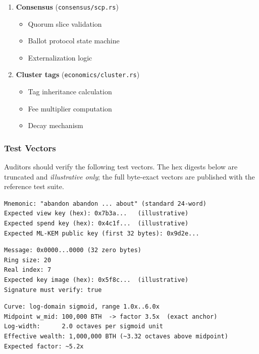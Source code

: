 \begin{enumerate}
  \item \textbf{Consensus} (\texttt{consensus/scp.rs})
    \begin{itemize}
      \item Quorum slice validation
      \item Ballot protocol state machine
      \item Externalization logic
    \end{itemize}

  \item \textbf{Cluster tags} (\texttt{economics/cluster.rs})
    \begin{itemize}
      \item Tag inheritance calculation
      \item Fee multiplier computation
      \item Decay mechanism
    \end{itemize}
\end{enumerate}

\subsubsection{Test Vectors}

Auditors should verify the following test vectors. The hex digests below are
truncated and \emph{illustrative only}; the full byte-exact vectors are
published with the reference test suite.

\begin{lstlisting}[caption={Key derivation test vector (illustrative)}]
Mnemonic: "abandon abandon ... about" (standard 24-word)
Expected view key (hex): 0x7b3a...   (illustrative)
Expected spend key (hex): 0x4c1f...  (illustrative)
Expected ML-KEM public key (first 32 bytes): 0x9d2e...
\end{lstlisting}

\begin{lstlisting}[caption={Ring signature test vector (illustrative)}]
Message: 0x0000...0000 (32 zero bytes)
Ring size: 20
Real index: 7
Expected key image (hex): 0x5f8c...  (illustrative)
Signature must verify: true
\end{lstlisting}

\begin{lstlisting}[caption={Cluster factor test vector (log-domain curve)}]
Curve: log-domain sigmoid, range 1.0x..6.0x
Midpoint w_mid: 100,000 BTH  -> factor 3.5x  (exact anchor)
Log-width:      2.0 octaves per sigmoid unit
Effective wealth: 1,000,000 BTH (~3.32 octaves above midpoint)
Expected factor: ~5.2x
\end{lstlisting}

